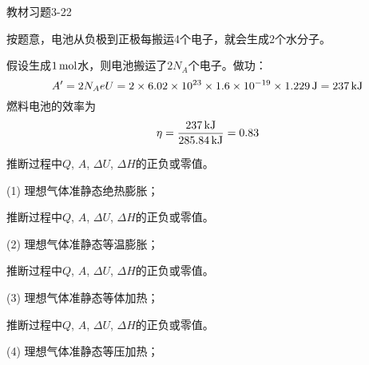 \documentclass[CJK]{beamer}
\begin{document}
\begin{frame}
\bch
{\blue 教材习题3-22}

按题意，电池从负极到正极每搬运4个电子，就会生成2个水分子。

假设生成$1\,\mathrm{mol}$水，则电池搬运了$2N_A$个电子。做功：
$$A' = 2N_A eU = 2\times 6.02\times 10^{23}\times 1.6\times 10^{-19} \times 1.229 \,\mathrm{J} = 237 \,\mathrm{kJ}$$
燃料电池的效率为
$$\eta = \frac{237\,\mathrm{kJ}}{285.84\,\mathrm{kJ}} =0.83$$ 
\ech
\end{frame}

\begin{frame}
\bch


推断过程中$Q$, $A$, $\Delta U$, $\Delta H$的正负或零值。

\bitem
\item[(1)]{理想气体准静态绝热膨胀；}
\eitem

\ech
\end{frame}

\begin{frame}
\bch


推断过程中$Q$, $A$, $\Delta U$, $\Delta H$的正负或零值。

\bitem
\item[(2)]{理想气体准静态等温膨胀；}
\eitem

\ech
\end{frame}


\begin{frame}
\bch


推断过程中$Q$, $A$, $\Delta U$, $\Delta H$的正负或零值。

\bitem
\item[(3)]{理想气体准静态等体加热；}
\eitem

\ech
\end{frame}

\begin{frame}
\bch


推断过程中$Q$, $A$, $\Delta U$, $\Delta H$的正负或零值。

\bitem
\item[(4)]{理想气体准静态等压加热；}
\eitem

\ech
\end{frame}
\end{document}
